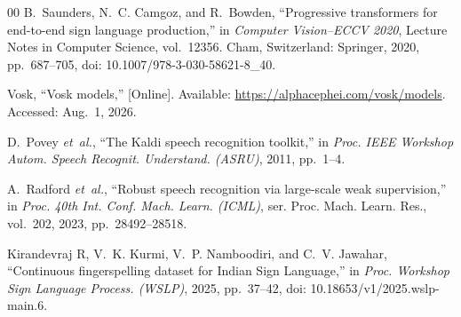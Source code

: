 \documentclass[conference]{IEEEtran}
\begin{document}
\begin{thebibliography}{00}
B.~Saunders, N.~C. Camgoz, and R.~Bowden, ``Progressive transformers for end-to-end sign language production,'' in \emph{Computer Vision--ECCV 2020}, Lecture Notes in Computer Science, vol.~12356. Cham, Switzerland: Springer, 2020, pp.~687--705, doi: 10.1007/978-3-030-58621-8\_40.

Vosk, ``Vosk models,'' [Online]. Available: \url{https://alphacephei.com/vosk/models}. Accessed: Aug.~1, 2026.

D.~Povey \emph{et~al.}, ``The Kaldi speech recognition toolkit,'' in \emph{Proc. IEEE Workshop Autom. Speech Recognit. Understand. (ASRU)}, 2011, pp.~1--4.

A.~Radford \emph{et~al.}, ``Robust speech recognition via large-scale weak supervision,'' in \emph{Proc. 40th Int. Conf. Mach. Learn. (ICML)}, ser. Proc. Mach. Learn. Res., vol.~202, 2023, pp.~28492--28518.

Kirandevraj R, V.~K. Kurmi, V.~P. Namboodiri, and C.~V. Jawahar, ``Continuous fingerspelling dataset for Indian Sign Language,'' in \emph{Proc. Workshop Sign Language Process. (WSLP)}, 2025, pp.~37--42, doi: 10.18653/v1/2025.wslp-main.6.

\end{thebibliography}
\end{document}
